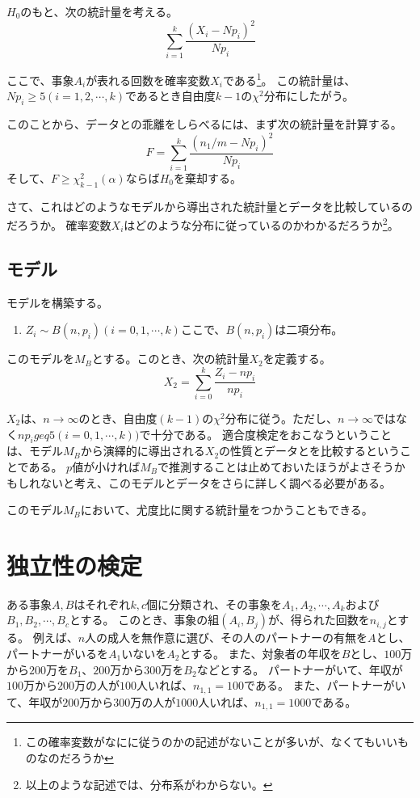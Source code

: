 $H_0$のもと、次の統計量を考える。
\begin{equation*}
 \sum_{i=1}^{k} \frac{(X_i - N p_i)^2}{N p_i}
\end{equation*}


ここで、事象$A_i$が表れる回数を確率変数$X_i$である\footnote{この確率変数がなにに従うのかの記述がないことが多いが、なくてもいいものなのだろうか}。
この統計量は、$N p_i \geq 5 (i=1,2,\cdots, k)$であるとき自由度$k-1$の$\chi^2$分布にしたがう。

このことから、データとの乖離をしらべるには、まず次の統計量を計算する。
\begin{equation*}
 F=\sum_{i=1}^{k} \frac{(n_1/m- N p_i)^2}{N p_i}
\end{equation*}
そして、$F \geq \chi^2_{k-1}(\alpha)$ならば$H_0$を棄却する。


さて、これはどのようなモデルから導出された統計量とデータを比較しているのだろうか。
確率変数$X_i$はどのような分布に従っているのかわかるだろうか\footnote{以上のような記述では、分布系がわからない。}。

\subsection{モデル}
モデルを構築する。
\begin{enumerate}
 \item $Z_i \sim B(n,p_i) (i=0,1,\cdots,k) $ここで、$B(n,p_i)$は二項分布。
\end{enumerate}
このモデルを$M_B$とする。このとき、次の統計量$X_2$を定義する。
\begin{equation*}
 X_2 = \sum_{i=0}^{k} \frac{Z_i-n p_i}{n p_i}
\end{equation*}


$X_2$は、$n\rightarrow \infty$のとき、自由度$(k-1)$の$\chi^2$分布に従う。ただし、$n\rightarrow \infty$ではなく$n p_i geq 5 (i=0,1,\cdots,k))$で十分である\cite{1050850569142531968}。
適合度検定をおこなうということは、モデル$M_B$から演繹的に導出される$X_2$の性質とデータとを比較するということである。
$p$値が小ければ$M_B$で推測することは止めておいたほうがよさそうかもしれないと考え、このモデルとデータをさらに詳しく調べる必要がある。

このモデル$M_B$において、尤度比に関する統計量をつかうこともできる。





\section{独立性の検定}
ある事象$A,B$はそれぞれ$k,c$個に分類され、その事象を$A_1,A_2,\cdots,A_k$および$B_1,B_2,\cdots,B_c$とする。
このとき、事象の組$(A_i,B_j)$が、得られた回数を$n_{i,j}$とする。
例えば、$n$人の成人を無作意に選び、その人のパートナーの有無を$A$とし、パートナーがいるを$A_1$いないを$A_2$とする。
また、対象者の年収を$B$とし、$100$万から$200$万を$B_1$、$200$万から$300$万を$B_2$などとする。
パートナーがいて、年収が$100$万から$200$万の人が$100$人いれば、$n_{1,1}=100$である。
また、パートナーがいて、年収が$200$万から$300$万の人が$1000$人いれば、$n_{1,1}=1000$である。

